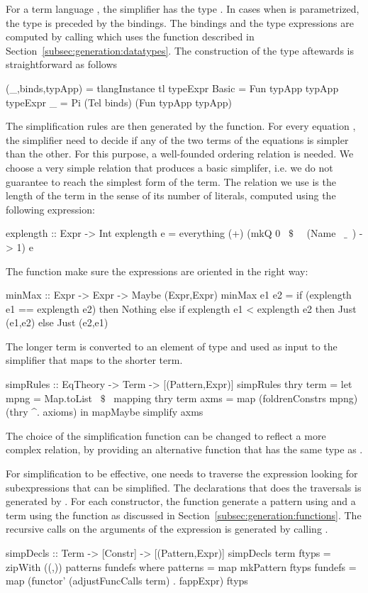 For a term language , the simplifier has the type . In cases when  is parametrized, the type is preceded by the bindings. The bindings and the type expressions are computed by calling  which uses the  function described in Section~\ref{subsec:generation:datatypes}. The construction of the type aftewards is straightforward as follows 
\begin{hscode} 
 (_,binds,typApp) = tlangInstance tl
 typeExpr Basic = Fun typApp typApp
 typeExpr _     = Pi (Tel binds) (Fun typApp typApp)
\end{hscode} 

The simplification rules are then generated by the  function. For every equation , the simplifier need to decide if any of the two terms of the equations is simpler than the other. For this purpose, a well-founded ordering relation is needed. We choose a very simple relation that produces a basic simplifer, i.e. we do not guarantee to reach the simplest form of the term. The relation we use is the length of the term in the sense of its number of literals, computed using the following expression: 
\begin{hscode} 
explength :: Expr -> Int
explength e = everything (+) (mkQ 0 ~$\$$~ \ (Name ~$\_$~) -> 1) e
\end{hscode} 
The function  make sure the expressions are oriented in the right way: 
\begin{hscode}
minMax :: Expr -> Expr -> Maybe (Expr,Expr)
minMax e1 e2 =
  if (explength e1 == explength e2) then Nothing
  else if explength e1 < explength e2 then Just (e1,e2)
  else Just (e2,e1) 
\end{hscode} 
The longer term is converted to an element of type  and used as input to the simplifier that maps to the shorter term.  
\begin{hscode} 
simpRules :: EqTheory -> Term -> [(Pattern,Expr)]
simpRules thry term =
 let mpng = Map.toList ~$\$$~ mapping thry term
     axms = map (foldrenConstrs mpng) (thry ^. axioms) 
 in mapMaybe simplify axms
\end{hscode} 
The choice of the simplification function can be changed to reflect a more complex relation, by providing an alternative function that has the same type as . 

For simplification to be effective, one needs to traverse the expression looking for subexpressions that can be simplified. The declarations that does the traversals is generated by . For each constructor, the function generate a pattern using  and a term using the  function as discussed in Section~\ref{subsec:generation:functions}. The recursive calls on the arguments of the expression is generated by calling . 
\begin{hscode}
simpDecls :: Term -> [Constr] -> [(Pattern,Expr)]
simpDecls term ftyps =
   zipWith ((,)) patterns fundefs
   where patterns = map mkPattern ftyps
         fundefs = map (functor' (adjustFuncCalls term) . fappExpr) ftyps
\end{hscode}

